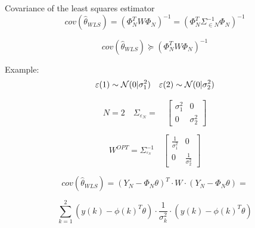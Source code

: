 Covariance of the least squares estimator
\begin{equation*}
cov({ \hat { \theta  } _{ WLS } }){ =({ \Phi  }_{ N }^{ T }W{ \Phi  }_{ N }) }^{ -1 }{ =({ \Phi  }_{ N }^{ T }{\Sigma}_{\in N }^{ -1 }{ \Phi  }_{ N }) }^{ -1 }
\end{equation*}

\begin{equation*}
cov({ \hat { \theta  } _{ WLS } }){ \succeq ({ \Phi  }_{ N }^{ T }W{ \Phi  }_{ N }) }^{ -1 }
\end{equation*}


Example:
\begin{equation*}
\varepsilon (1) \sim  { \cal{N} }(0|\sigma ^{ 2 }_{ 1 }) \quad \varepsilon (2) \sim  { \cal{N} }(0|\sigma ^{ 2 }_{ 2 })
\end{equation*}

\begin{equation*}
N=2 \quad { \Sigma  }_{ { \varepsilon  }_{ N } }=\quad \begin{bmatrix} \sigma _{ 1 }^{ 2 } & 0 \\ 0 & \sigma _{ 2 }^{ 2 } \end{bmatrix}
\end{equation*}

\begin{equation*}
W^{ OPT } = \Sigma _{ ^{ \varepsilon_{ N } } }^{ -1 }\quad \begin{bmatrix} \frac { 1 }{ \sigma _{ 1 }^{ 2 } }  & 0 \\ 0 & \frac { 1 }{ \sigma _{ 2 }^{ 2 } }  \end{bmatrix}
\end{equation*}

\begin{equation*}
cov({ \hat { \theta  } _{ WLS } }){ =({ Y }_{ N }-{ \Phi  }_{ N }\theta ) }^{ T }\cdot W\cdot ({ Y }_{ N }-{ \Phi  }_{ N }\theta )=
\end{equation*}

\begin{equation*}
\sum _{ k=1 }^{ 2 }{ (y(k)-{ \phi (k) }^{ T }\theta )\cdot \frac { 1 }{ { \sigma  }_{ k }^{ 2 } } \cdot (y(k)-{ \phi (k) }^{ T }\theta ) } 
\end{equation*}



